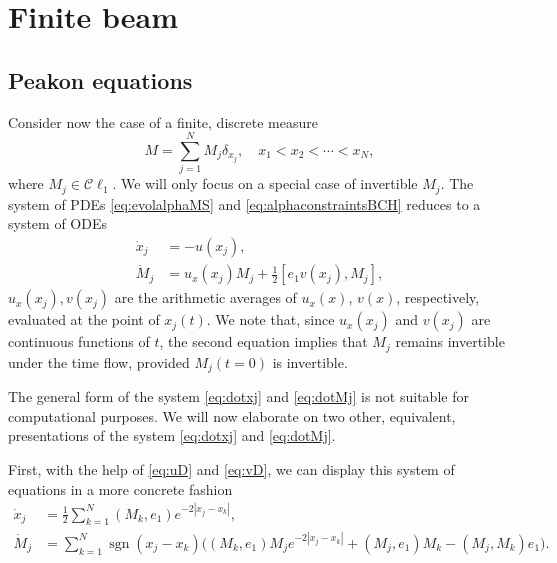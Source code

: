 \documentclass[10pt,a4paper]{article}
\numberwithin{equation}{section}
\theoremstyle{plain}
\theoremstyle{definition}
\newcommand\Cl{\mathcal{C}\ell}
\newcommand{\abs}[1]{\left\lvert #1 \right\rvert}
\DeclareMathOperator{\sgn}{sgn}
\begin{document}
 \section{Finite beam} 
 \subsection{ Peakon equations} 
 Consider now the case of a finite, discrete measure
\begin{equation*} 
M=\sum_{j=1}^N M_j \delta_{x_j}, \quad x_1<x_2<\cdots<x_N, 
\end{equation*}
where $M_j\in \Cl_1 $.    We will only focus on a special case of invertible $M_j$.  
The system of PDEs \eqref{eq:evolalphaMS} and \eqref{eq:alphaconstraintsBCH}
reduces to a system of ODEs
\begin{align} 
\dot x_j&=-u(x_j), \label{eq:dotxj}\\
\dot M_j&=u_x (x_j)M_j +\frac12[e_1v(x_j), M_j],    \label{eq:dotMj} 
\end{align} 
$u_x(x_j), v(x_j)$ are the arithmetic averages of $u_x(x)$, $v(x)$, respectively, evaluated at the point of $x_j(t)$. 
We note that, since $u_x(x_j) $ and $ v(x_j)$ are continuous functions of $t$, the second equation implies that $M_j$ remains invertible under the time flow, provided $M_j(t=0)$ is invertible.  

The general form of the system \eqref{eq:dotxj} and \eqref{eq:dotMj} is not suitable for computational purposes.  We will now elaborate on 
two other, equivalent, presentations of the system \eqref{eq:dotxj} and \eqref{eq:dotMj}.   

First, with the help of \eqref{eq:uD} and \eqref{eq:vD}, we can display this system of equations in a more 
concrete fashion
\begin{align}
\dot x_j&=\frac12 \sum_{k=1}^N (M_k,e_1) e^{-2\abs{x_j-x_k}},\label{eq:dotxjbis} \\
\dot M_j&=\sum_{k=1}^N \sgn (x_j-x_k)\big((M_k, e_1)M_j  e^{-2\abs{x_j-x_k}}+(M_j, e_1)M_k-(M_j,M_k) e_1\big). \label{eq:dotMjbis}
\end{align}
\end{document}
